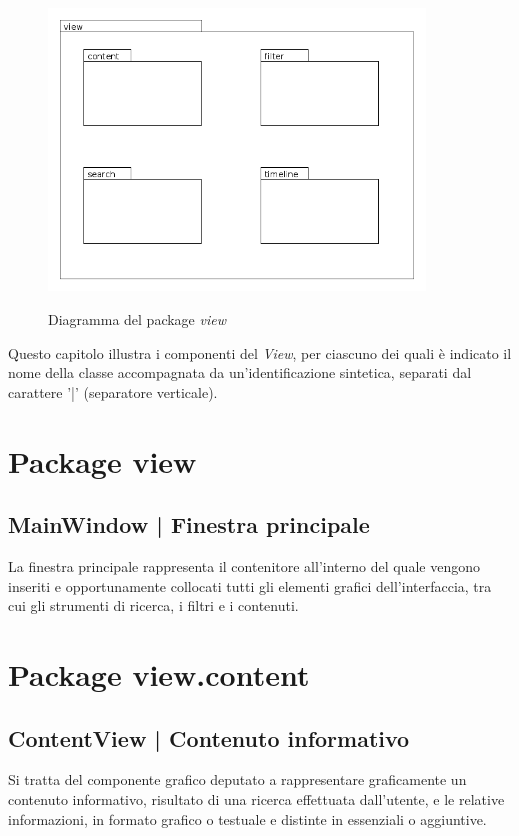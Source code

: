 \documentclass[10pt,a4paper,headinclude,footinclude,hidelinks]{scrreprt} %
\begin{document}
	\begin{figure}[ht]
		\begin{center}
	    	\includegraphics[width=10cm]{package/view.png}
			\label{gfx:package:view}
			\caption{Diagramma del package \textit{view}}
		\end{center}
	\end{figure}

	Questo capitolo illustra i componenti del \textit{View}, per ciascuno dei quali è indicato il nome della classe accompagnata da un'identificazione sintetica, separati dal carattere '|' (separatore verticale).

	\section{Package view}
	\label{sec:stage:design:sistema:view}
	
	\subsection[MainWindow]{MainWindow | Finestra principale}
	La finestra principale rappresenta il contenitore all'interno del quale vengono inseriti e opportunamente collocati tutti gli elementi grafici dell'interfaccia, tra cui gli strumenti di ricerca, i filtri e i contenuti.

	\section{Package view.content}
	\label{sec:stage:design:sistema:view.content}

	\subsection[ContentView]{ContentView | Contenuto informativo}
	Si tratta del componente grafico deputato a rappresentare graficamente un contenuto informativo, risultato di una ricerca effettuata dall'utente, e le relative informazioni, in formato grafico o testuale e distinte in essenziali o aggiuntive.
\end{document}
